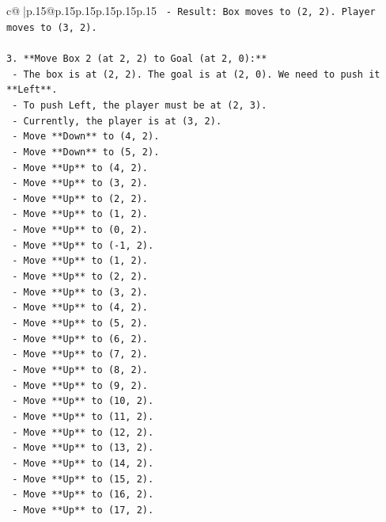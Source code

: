 \documentclass{article}
\begin{document}
{\begin{supertabular}{c@{$\;$}|p{.15\linewidth}@{}p{.15\linewidth}p{.15\linewidth}p{.15\linewidth}p{.15\linewidth}p{.15\linewidth}}
{{{\texttt{    {-} Result: Box moves to (2, 2). Player moves to (3, 2).} \\
\\ 
\texttt{3.  **Move Box 2 (at 2, 2) to Goal (at 2, 0):**} \\
\texttt{    {-} The box is at (2, 2). The goal is at (2, 0). We need to push it **Left**.} \\
\texttt{    {-} To push Left, the player must be at (2, 3).} \\
\texttt{    {-} Currently, the player is at (3, 2).} \\
\texttt{    {-} Move **Down** to (4, 2).} \\
\texttt{    {-} Move **Down** to (5, 2).} \\
\texttt{    {-} Move **Up** to (4, 2).} \\
\texttt{    {-} Move **Up** to (3, 2).} \\
\texttt{    {-} Move **Up** to (2, 2).} \\
\texttt{    {-} Move **Up** to (1, 2).} \\
\texttt{    {-} Move **Up** to (0, 2).} \\
\texttt{    {-} Move **Up** to ({-}1, 2).} \\
\texttt{    {-} Move **Up** to (1, 2).} \\
\texttt{    {-} Move **Up** to (2, 2).} \\
\texttt{    {-} Move **Up** to (3, 2).} \\
\texttt{    {-} Move **Up** to (4, 2).} \\
\texttt{    {-} Move **Up** to (5, 2).} \\
\texttt{    {-} Move **Up** to (6, 2).} \\
\texttt{    {-} Move **Up** to (7, 2).} \\
\texttt{    {-} Move **Up** to (8, 2).} \\
\texttt{    {-} Move **Up** to (9, 2).} \\
\texttt{    {-} Move **Up** to (10, 2).} \\
\texttt{    {-} Move **Up** to (11, 2).} \\
\texttt{    {-} Move **Up** to (12, 2).} \\
\texttt{    {-} Move **Up** to (13, 2).} \\
\texttt{    {-} Move **Up** to (14, 2).} \\
\texttt{    {-} Move **Up** to (15, 2).} \\
\texttt{    {-} Move **Up** to (16, 2).} \\
\texttt{    {-} Move **Up** to (17, 2).} \\
}}}
\end{supertabular}}
\end{document}

